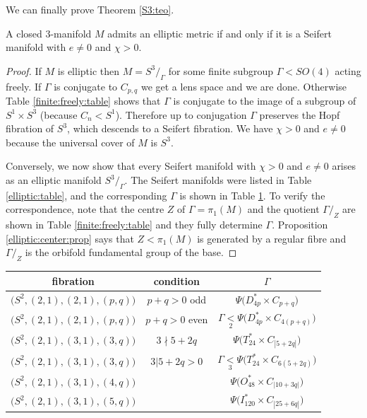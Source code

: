 We can finally prove Theorem \ref{S3:teo}.
\begin{teo}
A closed 3-manifold $M$ admits an elliptic metric if and only if it is a Seifert manifold  with $e\neq 0$ and $\chi>0$.
\end{teo}
\begin{proof}
If $M$ is elliptic then $M=S^3/_\Gamma$ for some finite subgroup $\Gamma < SO(4)$ acting freely. If $\Gamma$ is conjugate to $C_{p,q}$ we get a lens space and we are done. Otherwise Table \ref{finite:freely:table} shows that $\Gamma$ is conjugate to the image of a subgroup of $S^1\times S^3$ (because $C_n < S^1$). Therefore up to conjugation $\Gamma$ preserves the Hopf fibration of $S^3$, which descends to a Seifert fibration. We have $\chi>0$ and $e\neq 0$ because the universal cover of $M$ is $S^3$.

Conversely, we now show that every Seifert manifold with $\chi >0$ and $e \neq 0$ arises as an elliptic manifold $S^3/_\Gamma$. The Seifert manifolds were listed in Table \ref{elliptic:table}, and the corresponding $\Gamma$ is shown in Table \ref{elliptic:Seifert:table}.
To verify the correspondence, note that the centre $Z$ of $\Gamma = \pi_1(M)$ and the quotient $\Gamma/_Z$ are shown in Table \ref{finite:freely:table} and they fully determine $\Gamma$. Proposition \ref{elliptic:center:prop} says that $Z<\pi_1(M)$ is generated by a regular fibre and $\Gamma/_Z$ is the orbifold fundamental group of the base.
\end{proof}

\begin{table}
\begin{center}
\begin{tabular}{c||c||c}
\phantom{\Big|} fibration        & condition & $\Gamma$ \\
 \hline \hline
\phantom{\Big|} $\big(S^2,(2,1),(2,1),(p,q)\big)$ & ${p+q}>0$ odd &
$\Psi\big(D_{4p}^* \times C_{p+q}\big)$  \\
\phantom{\Big|} $\big(S^2,(2,1),(2,1),(p,q)\big)$ & ${p+q}>0$ even &
$\Gamma \underset 2< \Psi\big(D_{4p}^* \times C_{4(p+q)}\big)$ \\
\phantom{\Big|} $\big(S^2,(2,1),(3,1),(3,q)\big)$ & $3 \nmid 5+2q$ &
$\Psi\big(T_{24}^* \times C_{|5+2q|}\big)$ \\
\phantom{\Big|} $\big(S^2,(2,1),(3,1),(3,q)\big)$ & $3|5+2q>0$ &
$\Gamma \underset 3< \Psi\big(T_{24}^* \times C_{6(5+2q)}\big)$ \\
\phantom{\Big|} $\big(S^2,(2,1),(3,1),(4,q)\big)$ & &
$\Psi\big(O_{48}^* \times C_{|10+3q|}\big)$ \\
\phantom{\Big|} $\big(S^2,(2,1),(3,1),(5,q)\big)$ & &
$\Psi\big(I_{120}^* \times C_{|25+6q|}\big)$
\end{tabular}
\vspace{.2 cm}
\label{elliptic:Seifert:table}
\end{center}
\end{table}

